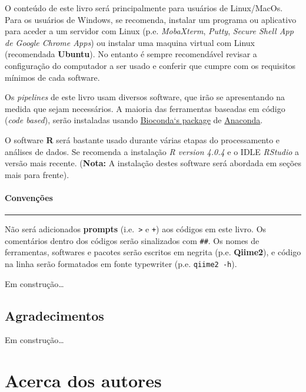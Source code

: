 \documentclass[
]{book}
\begin{document}
O conteúdo de este livro será principalmente para usuários de Linux/MacOs. Para os usuários de Windows, se recomenda, instalar um programa ou aplicativo para aceder a um servidor com Linux (p.e. \emph{MobaXterm}, \emph{Putty}, \emph{Secure Shell App de Google Chrome Apps}) ou instalar uma maquina virtual com Linux (recomendada \textbf{Ubuntu}). No entanto é sempre recomendável revisar a configuração do computador a ser usado e conferir que cumpre com os requisitos mínimos de cada software.

Os \emph{pipelines} de este livro usam diversos software, que irão se apresentando na medida que sejam necessários. A maioria das ferramentas baseadas em código (\emph{code based}), serão instaladas usando \href{https://anaconda.org/bioconda}{Bioconda`s package} de \href{https://anaconda.org/}{Anaconda}.

O software \textbf{R} será bastante usado durante várias etapas do processamento e análises de dados. Se recomenda a instalação \emph{R version 4.0.4} e o IDLE \emph{RStudio} a versão mais recente. (\textbf{Nota:} A instalação destes software será abordada em seções mais para frente).

\hypertarget{convenuxe7uxf5es}{%
\subsubsection*{Convenções}\label{convenuxe7uxf5es}}

\begin{center}\rule{0.5\linewidth}{0.5pt}\end{center}

Não será adicionados \textbf{prompts} (i.e.~\texttt{\textgreater{}} e \texttt{+}) aos códigos em este livro. Os comentários dentro dos códigos serão sinalizados com \texttt{\#\#}. Os nomes de ferramentas, softwares e pacotes serão escritos em negrita (p.e. \textbf{Qiime2}), e código na linha serão formatados em fonte typewriter (p.e. \texttt{qiime2\ -h}).

Em construção\ldots{}

\hypertarget{agradecimentos}{%
\section*{Agradecimentos}\label{agradecimentos}}

Em construção\ldots{}

\hypertarget{acerca-dos-autores}{%
\chapter*{Acerca dos autores}\label{acerca-dos-autores}}
\end{document}
